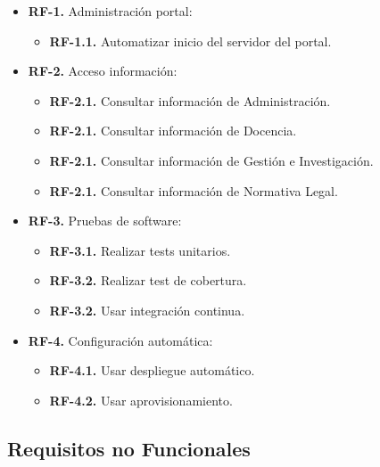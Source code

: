\begin{itemize}
  \item \textbf{RF-1.} Administración portal:
    \begin{itemize}
    \item \textbf{RF-1.1.} Automatizar inicio del servidor del portal.
    \end{itemize}
\end{itemize}

\begin{itemize}
  \item \textbf{RF-2.} Acceso información:
    \begin{itemize}
    \item \textbf{RF-2.1.} Consultar información de Administración.
    \item \textbf{RF-2.1.} Consultar información de Docencia.
    \item \textbf{RF-2.1.} Consultar información de Gestión e Investigación.
    \item \textbf{RF-2.1.} Consultar información de Normativa Legal.
    \end{itemize}
\end{itemize}

\begin{itemize}
  \item \textbf{RF-3.} Pruebas de software:
  \begin{itemize}
    \item \textbf{RF-3.1.} Realizar tests unitarios.
    \item \textbf{RF-3.2.} Realizar test de cobertura.
    \item \textbf{RF-3.2.} Usar integración continua.
    \end{itemize}
\end{itemize}

\begin{itemize}
  \item \textbf{RF-4.} Configuración automática:
  \begin{itemize}
    \item \textbf{RF-4.1.} Usar despliegue automático.
    \item \textbf{RF-4.2.} Usar aprovisionamiento.
    \end{itemize}
\end{itemize}

\subsection{Requisitos no Funcionales}

